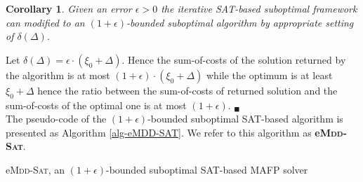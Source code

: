 \documentclass[letterpaper]{article}
\newtheorem{definition}{Definition}
\newtheorem{corollary}{Corollary}
\begin{document}
\begin{corollary}
Given an error $\epsilon>0$ the iterative SAT-based suboptimal framework can
modified to an $(1+\epsilon)$-bounded suboptimal algorithm by appropriate setting of
$\delta(\Delta)$.
\end{corollary}

 Let $\delta(\Delta)=\epsilon \cdot (\xi_0+\Delta)$. Hence the sum-of-costs of the solution returned by the algorithm is at most $(1+\epsilon) \cdot (\xi_0+\Delta)$ while the optimum is at least $\xi_0+\Delta$ hence the ratio between the sum-of-costs of returned solution and the sum-of-costs of the optimal one is at most $(1+\epsilon)$. $_\blacksquare$\\


The pseudo-code of the $(1+\epsilon)$-bounded suboptimal SAT-based algorithm is
presented as Algorithm \ref{alg-eMDD-SAT}. We refer to this algorithm as {\bf e\textsc{Mdd-Sat}}.



\begin{algorithm}[t]
\begin{footnotesize}
\SetAlgoLined {}  \caption{e\textsc{Mdd-Sat}, an $(1+\epsilon)$-bounded suboptimal SAT-based MAFP solver} \label{alg-eMDD-SAT}
\end{footnotesize}
\end{algorithm}
\end{document}
